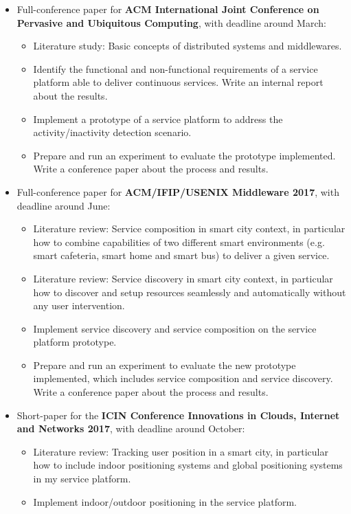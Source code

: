 \documentclass[]{article}
\begin{document}
\begin{itemize}
	\item Full-conference paper for \textbf{ACM International Joint Conference on Pervasive and Ubiquitous Computing}, with deadline around March:
		\begin{itemize}		
			\item Literature study: Basic concepts of distributed systems and middlewares.
			\item Identify the functional and non-functional requirements of a service platform able to deliver continuous services. Write an internal report about the results.
			\item Implement a prototype of a service platform to address the activity/inactivity detection scenario. 
			\item Prepare and run an experiment to evaluate the prototype implemented. Write a conference paper about the process and results.
		\end{itemize}
	\item Full-conference paper for \textbf{ACM/IFIP/USENIX Middleware 2017}, with deadline around June: 
		\begin{itemize}		
			\item Literature review: Service composition in smart city context, in particular how to combine capabilities of two different smart environments (e.g. smart cafeteria, smart home and smart bus)  to deliver a given service.
			\item Literature review: Service discovery in smart city context, in particular how to discover and setup resources seamlessly and automatically without any user intervention.
			\item Implement service discovery and service composition on the service platform prototype.
			\item Prepare and run an experiment to evaluate the new prototype implemented, which includes service composition and service discovery. Write a conference paper about the process and results.
		\end{itemize}
	\item Short-paper for the \textbf{ICIN Conference Innovations in Clouds, Internet and Networks 2017}, with deadline around October:
		\begin{itemize}		
			\item Literature review: Tracking user position in a smart city, in particular how to include indoor positioning systems and global positioning systems in my service platform.
			\item Implement indoor/outdoor positioning in the service platform.

\end{itemize}
\end{itemize}
\end{document}
